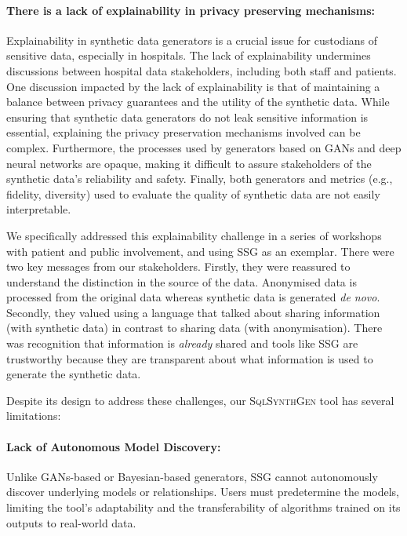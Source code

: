 \documentclass[11pt]{article}
\begin{document}
\paragraph{There is a lack of explainability in privacy preserving mechanisms:}
Explainability in synthetic data generators is a crucial issue for custodians of sensitive data, especially in hospitals. The lack of explainability undermines discussions between hospital data stakeholders, including both staff and patients. One discussion impacted by the lack of explainability is that of maintaining a balance between privacy guarantees and the utility of the synthetic data. While ensuring that synthetic data generators do not leak sensitive information is essential, explaining the privacy preservation mechanisms involved can be complex. Furthermore, the processes used by generators based on GANs and deep neural networks are opaque, making it difficult to assure stakeholders of the synthetic data's reliability and safety. Finally, both generators and metrics (e.g., fidelity, diversity) used to evaluate the quality of synthetic data  are not easily interpretable.

\vspace{1em}

We specifically addressed this explainability challenge in a series of workshops with patient and public involvement, and using SSG as an exemplar. There were two key messages from our stakeholders. Firstly, they were reassured to understand the distinction in the source of the data. Anonymised data is processed from the original data whereas synthetic data is generated \textit{de novo}. Secondly, they valued using a language that talked about sharing information (with synthetic data) in contrast to sharing data (with anonymisation). There was recognition that information is \textit{already} shared and tools like SSG are trustworthy because they are transparent about what information is used to generate the synthetic data.

\vspace{1em}

Despite its design to address these challenges, our \textsc{SqlSynthGen} tool has several limitations:

\paragraph{Lack of Autonomous Model Discovery:} Unlike GANs-based \cite{10.3390/math10152733} or Bayesian-based \cite{Cai2023} generators, SSG cannot autonomously discover underlying models or relationships. Users must predetermine the models, limiting the tool's adaptability and the transferability of algorithms trained on its outputs to real-world data.
\end{document}
